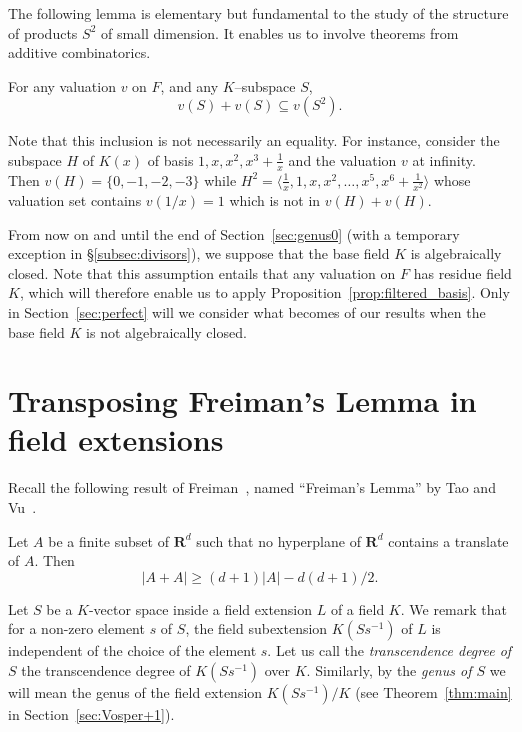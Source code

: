 \documentclass[ALCO,Unicode,ThmDefs]{cedram}
\newcommand*\R{{\mathbf R}}
\renewcommand{\geq}{\geqslant}
\begin{document}
The following lemma is elementary but fundamental to the study of the structure of products $S^2$ of small dimension. It enables us to involve theorems from additive combinatorics.

\begin{lemm}\label{lem:v(H^2)}
For any valuation $v$ on $F$, and any $K$--subspace $S$,
\begin{equation}\label{eq:valuation_product}
v(S)+v(S) \subseteq v(S^2).
\end{equation}
\end{lemm}

\begin{rema}
Note that this inclusion is not necessarily an equality. For instance, consider the subspace $H$ of $K(x)$ of basis $1, x, x^2, x^3 + \frac 1 x$ and the valuation $v$ at infinity. Then $v(H)=\{0,-1,-2,-3\}$ while $H^2=\langle \frac 1 x, 1, x, x^2, \ldots, x^5, x^6+\frac 1 {x^2}
\rangle$ whose valuation set contains $v(1/x)=1$ which is not in $v(H)+v(H)$.
\end{rema}

From now on and until the end of Section~\ref{sec:genus0} (with a temporary exception in
\S \ref{subsec:divisors}), we suppose that the base field $K$ is algebraically closed. Note that this assumption entails that any valuation on $F$ has residue field $K$, which will therefore enable us to apply Proposition~\ref{prop:filtered_basis}. Only in Section~\ref{sec:perfect} will we consider what becomes of our results when the base field $K$ is not algebraically closed.

\section{Transposing Freiman's Lemma in field extensions}\label{sec:freiman}

Recall the following result of Freiman~\cite{Freiman}, named ``Freiman's Lemma'' by Tao and Vu~\cite[Lemma~5.13]{TaoVu}.

\begin{theo}\label{thm:freiman}
Let $A$ be a finite subset of $\R^d$ such that no hyperplane of $\R^d$ contains a translate of $A$. Then
\[
|A+A|\geq(d+1)|A| -d(d+1)/2.
\]
\end{theo}

Let $S$ be a $K$-vector space inside a field extension $L$ of a field $K$. We remark that for a non-zero element $s$ of $S$, the field subextension $K(Ss^{-1})$ of $L$ is independent of the choice of the element $s$. Let us call the \emph{transcendence degree of $S$} the transcendence degree of $K(Ss^{-1})$ over $K$. Similarly, by the \emph{genus of $S$} we will mean the genus of the field extension $K(Ss^{-1})/K$ (see Theorem~\ref{thm:main} in Section~\ref{sec:Vosper+1}).
\end{document}
